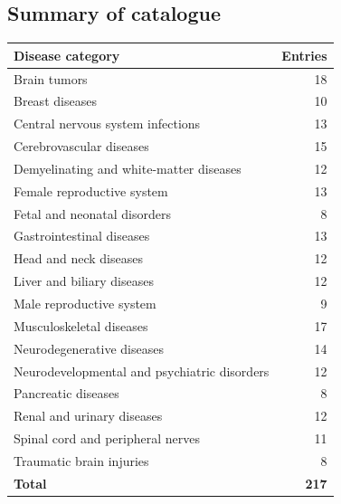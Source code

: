 \subsection{Summary of catalogue}
\begin{center}
\begin{tabular}{@{}p{}r@{}}
\toprule
\textbf{Disease category} & \textbf{Entries} \\
\midrule
Brain tumors & 18 \\
Breast diseases & 10 \\
Central nervous system infections & 13 \\
Cerebrovascular diseases & 15 \\
Demyelinating and white-matter diseases & 12 \\
Female reproductive system & 13 \\
Fetal and neonatal disorders & 8 \\
Gastrointestinal diseases & 13 \\
Head and neck diseases & 12 \\
Liver and biliary diseases & 12 \\
Male reproductive system & 9 \\
Musculoskeletal diseases & 17 \\
Neurodegenerative diseases & 14 \\
Neurodevelopmental and psychiatric disorders & 12 \\
Pancreatic diseases & 8 \\
Renal and urinary diseases & 12 \\
Spinal cord and peripheral nerves & 11 \\
Traumatic brain injuries & 8 \\
\midrule
\textbf{Total} & \textbf{217} \\
\bottomrule
\end{tabular}
\end{center}

